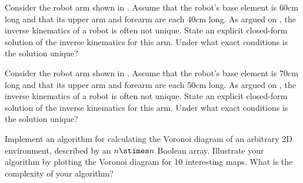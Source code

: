 

\begin{uexercise}%
Consider the robot arm shown in . Assume that the
robot's base element is 60cm long and that its upper arm and forearm are
each 40cm long.  As argued on
, the inverse kinematics of a
robot is often not unique. State an explicit closed-form solution of
the inverse kinematics for this arm.  Under what exact
conditions is the solution unique?
\end{uexercise} 

\begin{iexercise}%
Consider the robot arm shown in . Assume that the
robot's base element is 70cm long and that its upper arm and forearm are
each 50cm long.  As argued on
, the inverse kinematics of a
robot is often not unique. State an explicit closed-form solution of
the inverse kinematics for this arm.  Under what exact
conditions is the solution unique?
\end{iexercise} 

\begin{exercise}\prgex%
Implement an algorithm for calculating the
Voronoi diagram of an arbitrary 2D environment, described by an \(n\stimes n\) Boolean array.
Illustrate your algorithm by plotting the Voronoi diagram for 10 interesting maps.
What is the complexity of your algorithm?
\end{exercise} 

